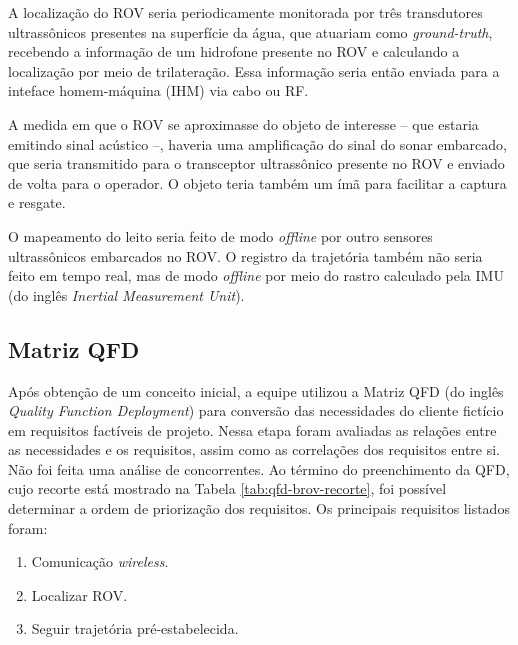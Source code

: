 A localização do ROV seria periodicamente monitorada por três transdutores ultrassônicos presentes na superfície da água, que atuariam como \textit{ground-truth}, recebendo a informação de um hidrofone presente no ROV e calculando a localização por meio de trilateração. Essa informação seria então enviada para a inteface homem-máquina (IHM) via cabo ou RF.

A medida em que o ROV se aproximasse do objeto de interesse -- que estaria emitindo sinal acústico --, haveria uma amplificação do sinal do sonar embarcado, que seria transmitido para o transceptor ultrassônico presente no ROV e enviado de volta para o operador. O objeto teria também um ímã para facilitar a captura e resgate.

O mapeamento do leito seria feito de modo \textit{offline} por outro sensores ultrassônicos embarcados no ROV. O registro da trajetória também não seria feito em tempo real, mas de modo \textit{offline} por meio do rastro calculado pela IMU (do inglês \textit{Inertial Measurement Unit}).


\subsection{Matriz QFD}
\label{subsec:matriz-qfd}

Após obtenção de um conceito inicial, a equipe utilizou a Matriz QFD (do inglês \textit{Quality Function Deployment}) para conversão das necessidades do cliente fictício em requisitos factíveis de projeto. Nessa etapa foram avaliadas as relações entre as necessidades e os requisitos, assim como as correlações dos requisitos entre si. Não foi feita uma análise de concorrentes. Ao término do preenchimento da QFD, cujo recorte está mostrado na Tabela \ref{tab:qfd-brov-recorte}, foi possível determinar a ordem de priorização dos requisitos. Os principais requisitos listados foram:

\begin{enumerate}
	\item Comunicação \textit{wireless}.
	\item Localizar ROV.
	\item Seguir trajetória pré-estabelecida.
\end{enumerate}

